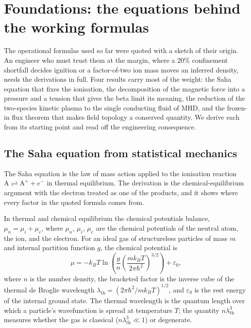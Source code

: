 \section{Foundations: the equations behind the working formulas}

The operational formulas used so far were quoted with a sketch of their
origin. An engineer who must trust them at the margin, where a $20\%$
confinement shortfall decides ignition or a factor-of-two ion mass moves an
inferred density, needs the derivations in full. Four results carry most of
the weight: the Saha equation that fixes the ionisation, the decomposition
of the magnetic force into a pressure and a tension that gives the beta
limit its meaning, the reduction of the two-species kinetic plasma to the
single conducting fluid of MHD, and the frozen-in flux theorem that makes
field topology a conserved quantity. We derive each from its starting point
and read off the engineering consequence.

\subsection{The Saha equation from statistical mechanics}

The Saha equation is the law of mass action applied to the ionisation
reaction $\mathrm{A} \rightleftharpoons \mathrm{A}^{+} + e^{-}$ in thermal
equilibrium. The derivation is the chemical-equilibrium argument with the
electron treated as one of the products, and it shows where every factor in
the quoted formula comes from.

In thermal and chemical equilibrium the chemical potentials balance,
$\mu_{n} = \mu_{i} + \mu_{e}$, where $\mu_{n}$, $\mu_{i}$, $\mu_{e}$ are the
chemical potentials of the neutral atom, the ion, and the electron. For an
ideal gas of structureless particles of mass $m$ and internal partition
function $g$, the chemical potential is
\[
\mu = -k_{B}T\ln\!\left(\frac{g}{n}\left(
\frac{m k_{B}T}{2\pi\hbar^{2}}\right)^{3/2}\right)
+ \varepsilon_{0},
\]
where $n$ is the number density, the bracketed factor is the inverse cube of
the thermal de Broglie wavelength $\lambda_{\mathrm{th}} =
(2\pi\hbar^{2}/m k_{B}T)^{1/2}$, and $\varepsilon_{0}$ is the rest energy of
the internal ground state. The thermal wavelength is the quantum length over
which a particle's wavefunction is spread at temperature $T$; the quantity
$n\lambda_{\mathrm{th}}^{3}$ measures whether the gas is classical
($n\lambda_{\mathrm{th}}^{3}\ll 1$) or degenerate.

